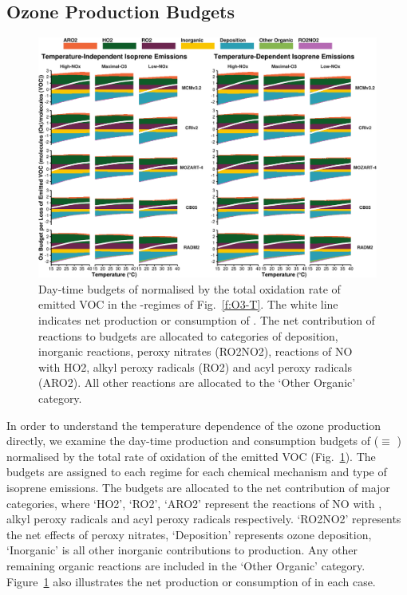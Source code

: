 \subsection{Ozone Production Budgets} \label{ss:r_budgets}
\begin{figure}[t]%
    \centering%
    \caption{Day-time budgets of  normalised by the total oxidation rate of emitted VOC in the -regimes of Fig.~\ref{f:O3-T}. The white line indicates net production or consumption of . The net contribution of reactions to  budgets are allocated to categories of deposition, inorganic reactions, peroxy nitrates (RO2NO2), reactions of NO with HO2, alkyl peroxy radicals (RO2) and acyl peroxy radicals (ARO2). All other reactions are allocated to the `Other Organic' category.}%
    \label{f:ozone_budgets}%
    \includegraphics[width = \textwidth]{img/Ox_budgets}%
    \vspace{-4mm}
\end{figure}
% 
In order to understand the temperature dependence of the ozone production directly, we examine the day-time production and consumption budgets of  ($\equiv$ ) normalised by the total rate of oxidation of the emitted VOC (Fig.~\ref{f:ozone_budgets}).
The  budgets are assigned to each  regime for each chemical mechanism and type of isoprene emissions.
The budgets are allocated to the net contribution of major categories, where `HO2', `RO2', `ARO2' represent the reactions of NO with , alkyl peroxy radicals and acyl peroxy radicals respectively.
`RO2NO2' represents the net effects of peroxy nitrates, `Deposition' represents ozone deposition, `Inorganic' is all other inorganic contributions to  production.
Any other remaining organic reactions are included in the `Other Organic' category.
Figure~\ref{f:ozone_budgets} also illustrates the net production or consumption of  in each case.

